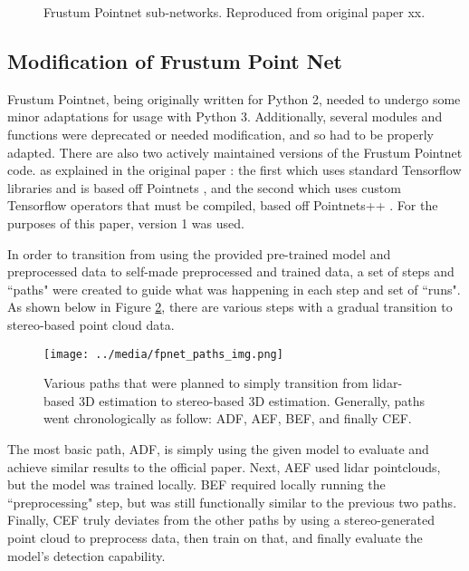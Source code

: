  \begin{figure}[H]
 	\centering
 	\caption{Frustum Pointnet sub-networks. Reproduced from original paper \cite{qi_frustum_2017} xx.}
 	\label{fpnet_subarch}
 \end{figure}


\subsection{Modification of Frustum Point Net}
Frustum Pointnet, being originally written for Python 2, needed to undergo some minor adaptations for usage with Python 3. Additionally, several modules and functions were deprecated or needed modification, and so had to be properly adapted. There are also two actively maintained versions of the Frustum Pointnet code. as explained in the original paper \cite{qi_frustum_2017}: the first which uses standard Tensorflow libraries and is based off Pointnets \cite{qi_pointnet:_2017}, and the second which uses custom Tensorflow operators that must be compiled, based off Pointnets++ \cite{qi_pointnet++:_2017}. For the purposes of this paper, version 1 was used.

In order to transition from using the provided pre-trained model and preprocessed data to self-made preprocessed and trained data, a set of steps and ``paths" were created to guide what was happening in each step and set of ``runs". As shown below in Figure \ref{fp_paths}, there are various steps with a gradual transition to stereo-based point cloud data.

\begin{figure}[H]
    \centering
    \texttt{[image: ../media/fpnet\_paths\_img.png]}
    \caption{Various paths that were planned to simply transition from lidar-based 3D estimation to stereo-based 3D estimation. Generally, paths went chronologically as follow: ADF, AEF, BEF, and finally CEF.}
    \label{fp_paths}
\end{figure}

The most basic path, ADF, is simply using the given model to evaluate and achieve similar results to the official paper. Next, AEF used lidar pointclouds, but the model was trained locally. BEF required locally running the ``preprocessing" step, but was still functionally similar to the previous two paths. Finally, CEF truly deviates from the other paths by using a stereo-generated point cloud to preprocess data, then train on that, and finally evaluate the model's detection capability.

